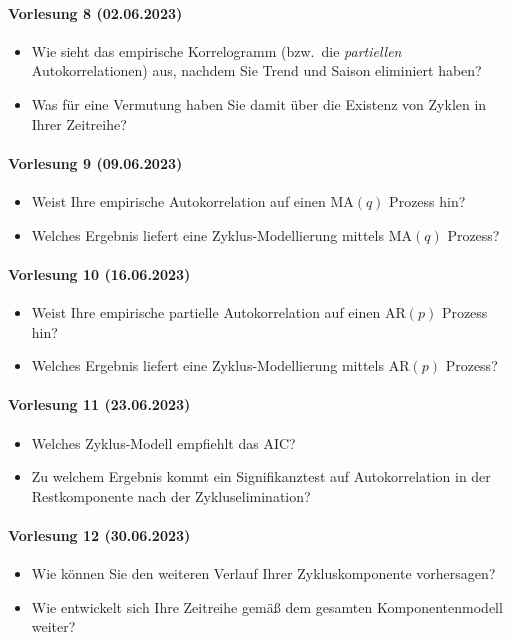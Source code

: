 \paragraph{Vorlesung 8 (02.06.2023)}
\begin{itemize}
    \item Wie sieht das empirische Korrelogramm (bzw.\ die \textit{partiellen} Autokorrelationen) aus, nachdem Sie Trend und Saison eliminiert haben? 
    \item Was für eine Vermutung haben Sie damit über die Existenz von Zyklen in Ihrer Zeitreihe?
\end{itemize}

\paragraph{Vorlesung 9 (09.06.2023)}
\begin{itemize}
    \item Weist Ihre empirische Autokorrelation auf einen $\text{MA}(q)$ Prozess hin?
    \item Welches Ergebnis liefert eine Zyklus-Modellierung mittels $\text{MA}(q)$ Prozess?
\end{itemize}

\paragraph{Vorlesung 10 (16.06.2023)}
\begin{itemize}
    \item Weist Ihre empirische partielle Autokorrelation auf einen $\text{AR}(p)$ Prozess hin?
    \item Welches Ergebnis liefert eine Zyklus-Modellierung mittels $\text{AR}(p)$ Prozess? 
\end{itemize}

\paragraph{Vorlesung 11 (23.06.2023)}
\begin{itemize}
    \item Welches Zyklus-Modell empfiehlt das AIC?
    \item Zu welchem Ergebnis kommt ein Signifikanztest auf Autokorrelation in der Restkomponente nach der Zykluselimination?
\end{itemize}

\paragraph{Vorlesung 12 (30.06.2023)}
\begin{itemize}
    \item Wie können Sie den weiteren Verlauf Ihrer Zykluskomponente vorhersagen?
    \item Wie entwickelt sich Ihre Zeitreihe gemäß dem gesamten Komponentenmodell weiter?
\end{itemize}
